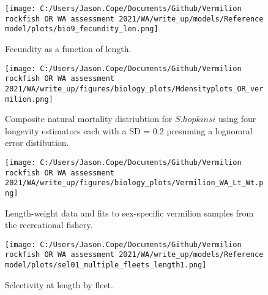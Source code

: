 \documentclass[11pt,
  english,
  a4paper,
]{article}
\begin{document}
\tagmcend\tagstructend


\begin{figure}
\centering
\texttt{[image: C:/Users/Jason.Cope/Documents/Github/Vermilion rockfish OR WA assessment 2021/WA/write\_up/models/Reference model/plots/bio9\_fecundity\_len.png]}
\caption{Fecundity as a function of length.\label{fig:fecundity}}
\end{figure}

\tagmcend\tagstructend


\begin{figure}
\centering
\texttt{[image: C:/Users/Jason.Cope/Documents/Github/Vermilion rockfish OR WA assessment 2021/WA/write\_up/figures/biology\_plots/Mdensityplots\_OR\_vermilion.png]}
\caption{Composite natural mortality distriubtion for {\(S. hopkinsi\)\leavevmode\tagmcend\tagstructend} using four longevity estimators each with a SD = 0.2 presuming a lognomral error distibution.\label{fig:M_composite_dists}}
\end{figure}

\tagmcend\tagstructend


\begin{figure}
\centering
\texttt{[image: C:/Users/Jason.Cope/Documents/Github/Vermilion rockfish OR WA assessment 2021/WA/write\_up/figures/biology\_plots/Vermilion\_WA\_Lt\_Wt.png]}
\caption{Length-weight data and fits to sex-specific vermilion samples from the recreational fishery.\label{fig:len-weight-fit}}
\end{figure}

\tagmcend\tagstructend


\begin{figure}
\centering
\texttt{[image: C:/Users/Jason.Cope/Documents/Github/Vermilion rockfish OR WA assessment 2021/WA/write\_up/models/Reference model/plots/sel01\_multiple\_fleets\_length1.png]}
\caption{Selectivity at length by fleet.\label{fig:selex}}
\end{figure}
\end{document}
